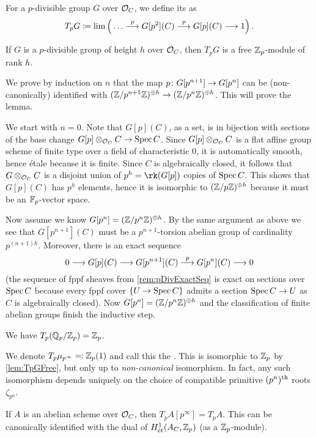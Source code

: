 \documentclass[a4paper, 10pt, oneside, DIV=9, chapterprefix=true, numbers=enddot,bibliography=totoc]{scrbook}
\begin{document}
\begin{defi}
	For a $p$-divisible group $G$ over $\mathcal{O}_C$, we define its  as
	\begin{equation*}
		T_pG\coloneqq \limit\Big(\dotso\morphism[p]G[p^2](C)\morphism[p]G[p](C)\morphism 1\Big)\,.
	\end{equation*}
\end{defi}
\begin{lem}\label{lem:TpGFree}
	If $G$ is a $p$-divisible group of height $h$ over $\mathcal{O}_C$, then $T_pG$ is a free $\mathbb{Z}_p$-module of rank $h$.
\end{lem}
\begin{proof*}
	We prove by induction on $n$ that the map $p\colon G[p^{n+1}]\morphism G[p^n]$ can be (non-canonically) identified with $(\IZ/p^{n+1}\IZ)^{\oplus h}\morphism (\IZ/p^n\IZ)^{\oplus h}$. This will prove the lemma.
	
	We start with $n=0$. Note that $G[p](C)$, as a set, is in bijection with sections of the base change $G[p]\otimes_{\Oo_C}C\morphism \Spec C$. Since $G[p]\otimes_{\mathcal{O}_C}C$ is a flat affine group scheme of finite type over a field of characteristic $0$, it is automatically smooth, hence étale because it is finite. Since $C$ is algebraically closed, it follows that $G\otimes_{\mathcal{O}_C}C$ is a disjoint union of $p^h=\rk(G[p])$ copies of $\operatorname{Spec} C$. This shows that $G[p](C)$ has $p^h$ elements, hence it is isomorphic to $(\mathbb{Z}/p\mathbb{Z})^{\oplus h}$ because it must be an $\mathbb{F}_p$-vector space.
	
	Now assume we know $G[p^n]=(\mathbb{Z}/p^n\mathbb{Z})^{\oplus h}$. By the same argument as above we see that $G[p^{n+1}](C)$ must be a $p^{n+1}$-torsion abelian group of cardinality $p^{(n+1)h}$. Moreover, there is an exact sequence
	\begin{equation*}
		0\morphism G[p](C)\morphism G[p^{n+1}](C)\morphism[p] G[p^n](C)\morphism 0
	\end{equation*}
	(the sequence of fppf sheaves from \cref{rem:pDivExactSeq} is exact on sections over $\operatorname{Spec} C$ because every fppf cover $\{U\morphism \Spec C\}$ admits a section $\Spec C\morphism U$ as $C$ is algebraically closed). Now $G[p^n]=(\mathbb{Z}/p^n\mathbb{Z})^{\oplus h}$ and the classification of finite abelian groups finish the inductive step.
\end{proof*}
\begin{exm}\label{exm:duals}
	\begin{numerate}
		\item We have $T_p(\mathbb{Q}_p/\mathbb{Z}_p)=\mathbb{Z}_p$.
		\item We denote $T_p\mu_{p^\infty}\eqqcolon \mathbb{Z}_p(1)$ and call this the . This is isomorphic to $\mathbb{Z}_p$ by \cref{lem:TpGFree}, but only up to \emph{non-canonical} isomorphism. In fact, any such isomorphism depends uniquely on the choice of compatible primitive $(p^n)^{\text{th}}$ roots $\zeta_{p^n}$.
		\item If $A$ is an abelian scheme over $\mathcal{O}_C$, then $T_pA[p^\infty]=T_pA$. This can be canonically identified with the dual of $H_{\mathrm{\acute{e}t}}^1(A_C,\mathbb{Z}_p)$ (as a $\mathbb{Z}_p$-module).
	\end{numerate}
\end{exm}
\end{document}
